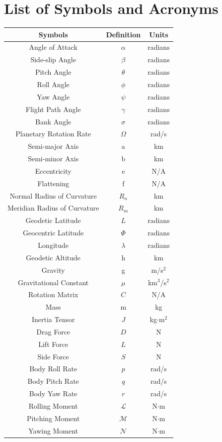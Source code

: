 \documentclass[12pt]{article}
\numberwithin{equation}{section}
\numberwithin{figure}{section}
\numberwithin{table}{section}
\begin{document}
\section*{List of Symbols and Acronyms}
\vfill
\begin{center}
\begin{tabular}{|c|c|c|}
\hline
\textbf{Symbols} & \textbf{Definition} & \textbf{Units} \\
\hline
Angle of Attack & $\alpha$ & radians\\
\hline
Side-slip Angle & $\beta$ & radians\\
\hline
Pitch Angle & $\theta$ & radians\\
\hline
Roll Angle & $\phi$ & radians\\
\hline
Yaw Angle & $\psi$ & radians\\
\hline
Flight Path Angle & $\gamma$ & radians\\
\hline
Bank Angle & $\sigma$ & radians\\
\hline
Planetary Rotation Rate & $\Omega$ & rad/s\\
\hline
Semi-major Axis & a & km\\
\hline
Semi-minor Axis & b & km\\
\hline
Eccentricity & e & N/A\\
\hline
Flattening & f & N/A\\
\hline
Normal Radius of Curvature & $R_n$ & km\\
\hline
Meridian Radius of Curvature & $R_m$ & km\\
\hline
Geodetic Latitude & $L$ & radians\\
\hline
Geocentric Latitude & $\Phi$ & radians\\
\hline
Longitude & $\lambda$ & radians\\
\hline
Geodetic Altitude & h & km\\
\hline
Gravity & g & m/s$^2$\\
\hline
Gravitational Constant & $\mu$ & km$^3$/s$^2$\\
\hline
Rotation Matrix & $C$ & N/A\\
\hline
Mass & m & kg\\
\hline
Inertia Tensor & $J$ & kg$\cdot$m$^2$\\
\hline
Drag Force & $D$ & N\\
\hline
Lift Force & $L$ & N\\
\hline
Side Force & $S$ & N\\
\hline
Body Roll Rate & $p$ & rad/s\\
\hline
Body Pitch Rate & $q$ & rad/s\\
\hline
Body Yaw Rate & $r$ & rad/s\\
\hline
Rolling Moment & $\mathcal{L}$ & N$\cdot$m\\
\hline
Pitching Moment & $\mathcal{M}$ & N$\cdot$m\\
\hline
Yawing Moment & $\mathcal{N}$ & N$\cdot$m\\
\hline


\end{tabular}
\end{center}
\end{document}
